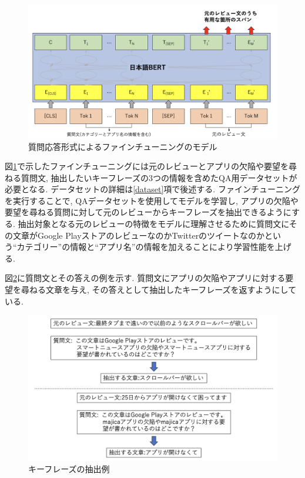 \begin{figure}[H]
  \centering
  \includegraphics[scale=0.3]
    {contents/images/fine-tuning.png}
  \caption{質問応答形式によるファインチューニングのモデル\label{fig:fine-tuning}}
\end{figure}
\noindent
図\ref{fig:fine-tuning}で示したファインチューニングには元のレビューとアプリの欠陥や要望を尋ねる質問文, 抽出したいキーフレーズの3つの情報を含めたQA用データセットが必要となる. データセットの詳細は\ref{dataset}項で後述する. 
ファインチューニングを実行することで, QAデータセットを使用してモデルを学習し, アプリの欠陥や要望を尋ねる質問に対して元のレビューからキーフレーズを抽出できるようにする. %
抽出対象となる元のレビューの特徴をモデルに理解させるために質問文にその文章がGoogle PlayストアのレビューなのかTwitterのツイートなのかという``カテゴリー''の情報と``アプリ名''の情報を加えることにより学習性能を上げる. 

図\ref{fig:answer}に質問文とその答えの例を示す. 質問文にアプリの欠陥やアプリに対する要望を尋ねる文章を与え, その答えとして抽出したキーフレーズを返すようにしている. 

\begin{figure}[H]
  \centering
  \includegraphics[scale=0.4]
       {contents/images/answer.png}
  \caption{キーフレーズの抽出例\label{fig:answer}}
\end{figure}

